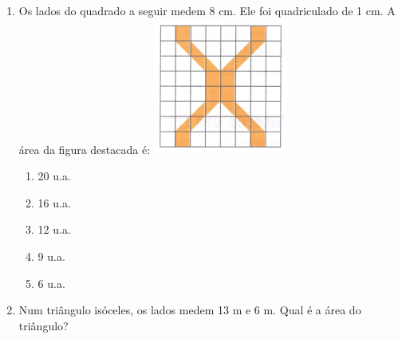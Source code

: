 \documentclass[a4paper,14pt]{article}
\begin{document}
	\begin{multicols}{2}
		\begin{enumerate}
			\item Os lados do quadrado a seguir medem 8 cm. Ele foi quadriculado de 1 cm. A área da figura destacada é:
			\includegraphics[width=1\linewidth]{8FMA25_imagens/imagem2}
			\begin{enumerate}
				\item 20 u.a.
				\item 16 u.a.
				\item 12 u.a.
				\item 9 u.a.
				\item 6 u.a.\\
			\end{enumerate}
		    \item Num triângulo isóceles, os lados medem 13 m e 6 m. Qual é a área do triângulo? \\\\\\\\\\\\\\\\\\\\\\\\\\\\\\\\\\\\\\\\

\end{enumerate}
\end{multicols}
\end{document}
